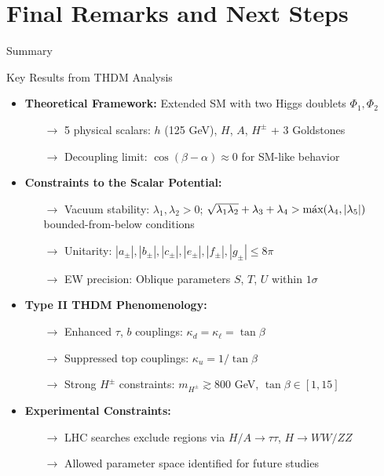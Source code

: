 \documentclass{../bredelebeamer}
\begin{document}
\section{Final Remarks and Next Steps}
\begin{frame}{Summary}
    \begin{block}{Key Results from THDM Analysis}
        \begin{itemize}
            \item \textbf{Theoretical Framework:} Extended SM with two Higgs doublets $\Phi_1, \Phi_2$ 
            \begin{itemize}
                \item[$\rightarrow$] 5 physical scalars: $h$ (125 GeV), $H$, $A$, $H^\pm$ + 3 Goldstones
                \item[$\rightarrow$] Decoupling limit: $\cos(\beta-\alpha) \approx 0$ for SM-like behavior
            \end{itemize}
            
            \item \textbf{Constraints to the Scalar Potential:}
            \begin{itemize}
                \item[$\rightarrow$] Vacuum stability: $\lambda_1, \lambda_2 > 0$; $\sqrt{\lambda_1\lambda_2}+\lambda_3+\lambda_4 > \text{máx}(\lambda_4, \abs{\lambda_5})$ bounded-from-below conditions
                \item[$\rightarrow$] Unitarity: $|a_\pm|, |b_\pm|, |c_\pm|, |e_\pm|, |f_\pm|, |g_\pm| \leq 8\pi$
                \item[$\rightarrow$] EW precision: Oblique parameters $S$, $T$, $U$ within $1\sigma$
            \end{itemize}
            
            \item \textbf{Type II THDM Phenomenology:}
            \begin{itemize}
                \item[$\rightarrow$] Enhanced $\tau$, $b$ couplings: $\kappa_d = \kappa_\ell = \tan\beta$
                \item[$\rightarrow$] Suppressed top couplings: $\kappa_u = 1/\tan\beta$
                \item[$\rightarrow$] Strong $H^\pm$ constraints: $m_{H^\pm} \gtrsim 800$ GeV, $\tan\beta \in [1,15]$
            \end{itemize}
            
            \item \textbf{Experimental Constraints:}
            \begin{itemize}
                \item[$\rightarrow$] LHC searches exclude regions via $H/A \to \tau\tau$, $H \to WW/ZZ$
                \item[$\rightarrow$] Allowed parameter space identified for future studies
            \end{itemize}
        \end{itemize}
    \end{block}
    

\end{frame}
\end{document}
